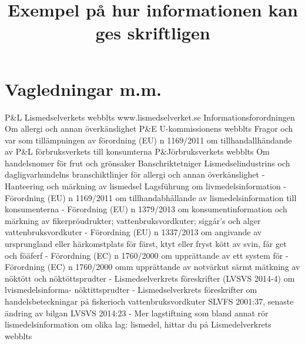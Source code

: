 \section*{Vagledningar m.m.}
P\&L Lismedselverkets webblts www.lismedselverket.se Informationsforordningen
Om allergi och annan överkänslighet
P\&E U-kommissionens webblts
Fragor och var som tillämpningen av förordning (EU) n 1169/2011 om tillhandallhändande av
P\&L förbruksverkets till konsumterna
P\&Jörbruksverkets webblts
Om handelsnomer för frut och grönsaker
Banschriktetniger
Lismedselindustrins och dagligvarhundelns branschiktlinjer för allergi och annan överkänslighet - Hanteering och märkning av lismedsel
Lagsführung om livmedelsinformation
- Förordning (EU) n 1169/2011 om tillhandabhållande av
lismedelsinformation till konsumenterna
- Förordning (EU) n 1379/2013 om konsumentinformation och
märkning av fikerpröudrukter; vattenbruksvordkuter; siggår's och alger
vattenbruksvordkuter
- Förordning (EU) n 1337/2013 om angivande av ursprungland eller
härkomstplats för färst, ktyt eller fryst kött av svin, får get och föäferf
- Förordning (EC) n 1760/2000 om upprättande av ett system för
- Förordning (EC) n 1760/2000 omm upprättande av notvärkut särmt mätkning av nöktött och nöktöttsprudter
- Lismedselverkrets föreskrifter (LVSVS 2014-4) om lvismedelsinforma-
nöktittsprudter
- Lismedselverkrets föreskrifter om handelsbeteckningar på fiskerioch vattenbruksvordkuter SLVFS 2001:37, senaste ändring av bilgan LVSVS 2014:23
- Mer lagstiftning som bland annat rör lismedelsinformation om olika lag: lismedel, hittar du på Lismedelverkrets webblts

\title{
Exempel på hur informationen kan ges skriftligen
}

